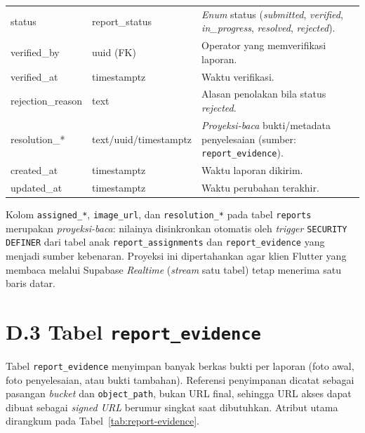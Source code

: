 \begin{table}[htbp]
\begin{tabular}{p{3.4cm} p{2.6cm} p{6.5cm}}
status & report\_status & \textit{Enum} status (\textit{submitted}, \textit{verified}, \textit{in\_progress}, \textit{resolved}, \textit{rejected}). \\
verified\_by & uuid (FK) & Operator yang memverifikasi laporan. \\
verified\_at & timestamptz & Waktu verifikasi. \\
rejection\_reason & text & Alasan penolakan bila status \textit{rejected}. \\
resolution\_* & text/\allowbreak{}uuid/\allowbreak{}timestamptz & \textit{Proyeksi-baca} bukti/metadata penyelesaian (sumber: \texttt{report\_evidence}). \\
created\_at & timestamptz & Waktu laporan dikirim. \\
updated\_at & timestamptz & Waktu perubahan terakhir. \\
\bottomrule
\end{tabular}
\end{table}

Kolom \texttt{assigned\_*}, \texttt{image\_url}, dan \texttt{resolution\_*} pada tabel \texttt{reports} merupakan \textit{proyeksi-baca}: nilainya disinkronkan otomatis oleh \textit{trigger} \texttt{SECURITY DEFINER} dari tabel anak \texttt{report\_assignments} dan \texttt{report\_evidence} yang menjadi sumber kebenaran. Proyeksi ini dipertahankan agar klien Flutter yang membaca melalui Supabase \textit{Realtime} (\textit{stream} satu tabel) tetap menerima satu baris datar.

\section*{D.3 Tabel \texttt{report\_evidence}}

Tabel \texttt{report\_evidence} menyimpan banyak berkas bukti per laporan (foto awal, foto penyelesaian, atau bukti tambahan). Referensi penyimpanan dicatat sebagai pasangan \textit{bucket} dan \texttt{object\_path}, bukan URL final, sehingga URL akses dapat dibuat sebagai \textit{signed URL} berumur singkat saat dibutuhkan. Atribut utama dirangkum pada Tabel~\ref{tab:report-evidence}.

